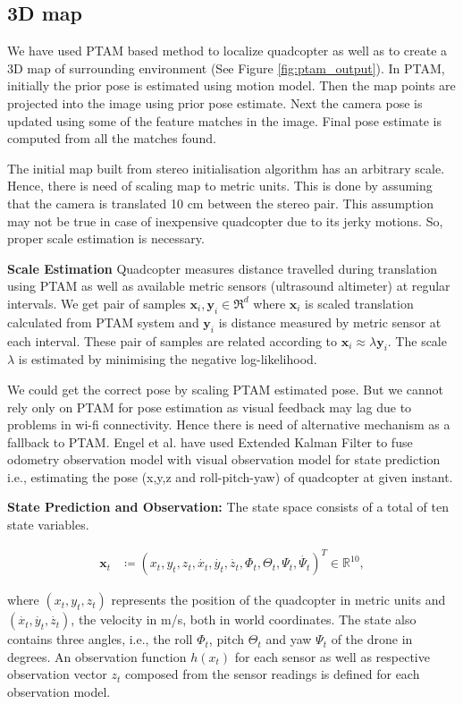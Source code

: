 \subsection{ 3D map }
We have used PTAM based method \cite{engel} to localize quadcopter as well as to
create a 3D map of surrounding environment (See Figure \ref{fig:ptam_output}).
In PTAM, initially the prior pose is estimated using motion model. Then the map
points are projected into the image using prior pose estimate. Next the camera
pose is updated using some of the feature matches in the image. Final pose
estimate is computed from all the matches found.
 
The initial map built from stereo initialisation algorithm has an arbitrary
scale. Hence, there is need of scaling map to metric units. This is done by
assuming that the camera is translated 10 cm between the stereo pair. This
assumption may not be true in case of inexpensive quadcopter due to its jerky
motions. So, proper scale estimation is necessary.

\textbf{Scale Estimation}
Quadcopter measures distance travelled during translation using PTAM as well as
available metric sensors (ultrasound altimeter) at regular intervals. We get
pair of samples $\mathbf{x}_i, \mathbf{y}_i \in {\Re}^d$ where $\mathbf{x}_i$ is
scaled translation calculated from PTAM system and $\mathbf{y}_i$ is distance
measured by metric sensor at each interval. These pair of samples are related
according to $\mathbf{x}_i \approx \lambda \mathbf{y}_i$. The scale $\lambda$ is
estimated by minimising the negative log-likelihood\cite{engel}.  

We could get the correct pose by  scaling  PTAM estimated pose. But we
cannot rely only on PTAM for pose estimation as visual feedback may lag due to
problems in wi-fi connectivity. Hence there is need of  alternative
mechanism as a fallback to PTAM. Engel et al. \cite{engel} have used Extended
Kalman Filter to fuse odometry observation model with visual observation model for state prediction i.e.,
estimating the pose (x,y,z and roll-pitch-yaw) of quadcopter at given  instant.

\textbf{State Prediction and Observation:} The state space consists of a total
of ten state variables. 
\begin{ceqn}
\begin{align}
	\mathbf{x}_t &\coloneqq {(x_t, y_t, z_t, \dot{x_t}, \dot{y_t},
	\dot{z_t}, {\Phi}_t, {\Theta}_t, {\Psi}_t, \dot{{\Psi}_t} )}^T  \in
	{\mathbb{R}}^{10},
\end{align}
\end{ceqn}
where $(x_t, y_t, z_t)$ represents the position of the quadcopter in
metric units and $(\dot{x_t}, \dot{y_t}, \dot{z_t})$, the velocity in m/s, both
in world coordinates. The state also contains three angles, i.e., the roll
${\Phi}_t$, pitch ${\Theta}_t$ and yaw ${\Psi}_t$ of the drone in degrees.  An observation
function $h(x_t)$ for each sensor as well as respective observation vector $z_t$
composed from the sensor readings is defined for each observation model.

